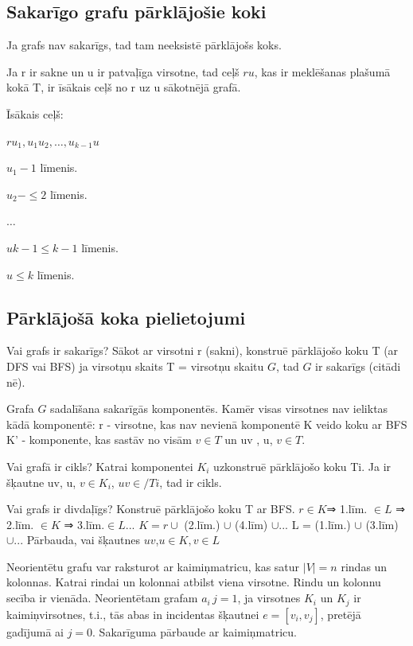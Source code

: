 \documentclass{article}
\begin{document}
\subsection{Sakarīgo grafu pārklājošie koki}

Ja grafs nav sakarīgs, tad tam neeksistē pārklājošs koks.

Ja r ir sakne un u ir patvaļīga virsotne, tad ceļš $ru$, kas ir meklēšanas plašumā kokā T, ir īsākais ceļš no r uz u sākotnējā grafā.

Īsākais ceļš: 

$ru_1 , u_1 u_2 , \ldots,u_{k -1}u$

$u_1 - 1$ līmenis.

$u_2 − \le 2$ līmenis.

$\ldots$

$u{k −1} \le k-1$ līmenis.

$u \le k$ līmenis.

\subsection{Pārklājošā koka pielietojumi}

Vai grafs ir sakarīgs? Sākot ar virsotni r (sakni), konstruē pārklājošo koku T (ar DFS vai BFS) ja virsotņu skaits T = virsotņu skaitu $ G $, tad $ G $ ir sakarīgs (citādi nē).

Grafa $ G $ sadalīšana sakarīgās komponentēs. 
Kamēr visas virsotnes nav ieliktas kādā komponentē: r - virsotne, kas nav nevienā komponentē K veido koku ar BFS K' - komponente, kas sastāv no visām $v \in T$ un uv , u, $v \in T$.  

Vai grafā ir cikls?  Katrai komponentei $K_i$ uzkonstruē pārklājošo koku Ti. Ja ir šķautne uv, u, $v \in K_i$, $uv \in / Ti$, tad ir cikls. 

Vai grafs ir divdaļīgs?  Konstruē pārklājošo koku T ar BFS.
$r \in K $⇒ 1.līm. $\in L$ ⇒ 2.līm. $\in K$ ⇒ 3.līm.$ \in L$...
$K = r \cup $ (2.līm.) $\cup$ (4.līm) $\cup$...
L = (1.līm.) $\cup$ (3.līm) $\cup$...
Pārbauda, vai šķautnes $uv$,$u \in K , v \in L$ 

Neorientētu grafu var raksturot ar kaimiņmatricu, kas satur $|V | = n$ rindas un kolonnas.  Katrai rindai un kolonnai atbilst viena virsotne.  Rindu un kolonnu secība ir vienāda.  Neorientētam grafam $a_i \, j = 1$, ja virsotnes $K_i$ un $K_j$ ir kaimiņvirsotnes, t.i., tās abas in incidentas šķautnei $e = [v_i , v_j ]$, pretējā gadījumā ai $j = 0$.  
Sakarīguma pārbaude ar kaimiņmatricu.
\end{document}
